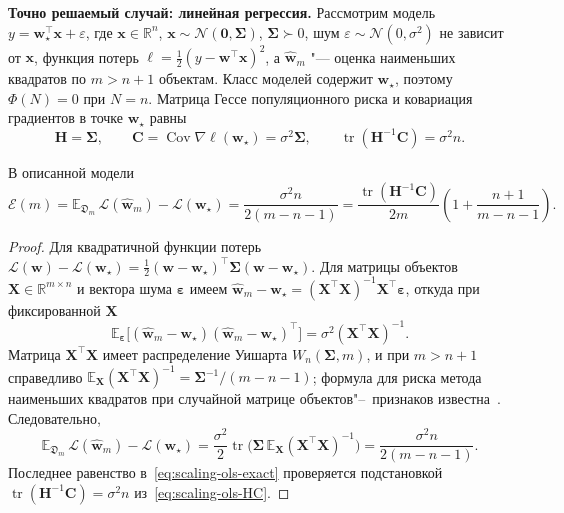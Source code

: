 \textbf{Точно решаемый случай: линейная регрессия.} Рассмотрим модель $y = \mathbf w_\star^\top \mathbf x + \varepsilon$, где $\mathbf x \in \mathbb R^n$, $\mathbf x \sim \mathcal N(\mathbf 0, \boldsymbol\Sigma)$, $\boldsymbol\Sigma \succ 0$, шум $\varepsilon \sim \mathcal N(0, \sigma^2)$ не зависит от $\mathbf x$, функция потерь $\ell = \frac12 (y - \mathbf w^\top \mathbf x)^2$, а $\hat{\mathbf w}_m$ "--- оценка наименьших квадратов по $m > n + 1$ объектам. Класс моделей содержит $\mathbf w_\star$, поэтому $\Phi(N) = 0$ при $N = n$. Матрица Гессе популяционного риска и ковариация градиентов в точке $\mathbf w_\star$ равны
\begin{equation}
    \label{eq:scaling-ols-HC}
    \mathbf H = \boldsymbol\Sigma,
    \qquad
    \mathbf C = \operatorname{Cov}\nabla\ell(\mathbf w_\star) = \sigma^2 \boldsymbol\Sigma,
    \qquad
    \operatorname{tr}(\mathbf H^{-1}\mathbf C) = \sigma^2 n.
\end{equation}

\begin{proposition}
    \label{prop:scaling-ols-exact}
    В описанной модели
    \begin{equation}
        \label{eq:scaling-ols-exact}
        \mathcal E(m)
        =
        \mathbb E_{\mathfrak D_m}\,\mathcal L(\hat{\mathbf w}_m) - \mathcal L(\mathbf w_\star)
        =
        \frac{\sigma^2 n}{2(m - n - 1)}
        =
        \frac{\operatorname{tr}(\mathbf H^{-1}\mathbf C)}{2m}\left(1 + \frac{n+1}{m-n-1}\right).
    \end{equation}
\end{proposition}

\begin{proof}
    Для квадратичной функции потерь $\mathcal L(\mathbf w) - \mathcal L(\mathbf w_\star) = \frac12 (\mathbf w - \mathbf w_\star)^\top \boldsymbol\Sigma (\mathbf w - \mathbf w_\star)$. Для матрицы объектов $\mathbf X \in \mathbb R^{m \times n}$ и вектора шума $\boldsymbol\varepsilon$ имеем $\hat{\mathbf w}_m - \mathbf w_\star = (\mathbf X^\top\mathbf X)^{-1}\mathbf X^\top\boldsymbol\varepsilon$, откуда при фиксированной $\mathbf X$
    \[
        \mathbb E_{\boldsymbol\varepsilon}\big[(\hat{\mathbf w}_m - \mathbf w_\star)(\hat{\mathbf w}_m - \mathbf w_\star)^\top\big] = \sigma^2 (\mathbf X^\top\mathbf X)^{-1}.
    \]
    Матрица $\mathbf X^\top\mathbf X$ имеет распределение Уишарта $W_n(\boldsymbol\Sigma, m)$, и при $m > n + 1$ справедливо $\mathbb E_{\mathbf X}(\mathbf X^\top\mathbf X)^{-1} = \boldsymbol\Sigma^{-1}/(m - n - 1)$; формула для риска метода наименьших квадратов при случайной матрице объектов"--~признаков известна~\cite{breiman1983variables}. Следовательно,
    \[
        \mathbb E_{\mathfrak D_m}\,\mathcal L(\hat{\mathbf w}_m) - \mathcal L(\mathbf w_\star)
        = \frac{\sigma^2}{2}\operatorname{tr}\big(\boldsymbol\Sigma\,\mathbb E_{\mathbf X}(\mathbf X^\top\mathbf X)^{-1}\big)
        = \frac{\sigma^2 n}{2(m - n - 1)}.
    \]
    Последнее равенство в~\eqref{eq:scaling-ols-exact} проверяется подстановкой $\operatorname{tr}(\mathbf H^{-1}\mathbf C) = \sigma^2 n$ из~\eqref{eq:scaling-ols-HC}.
\end{proof}


